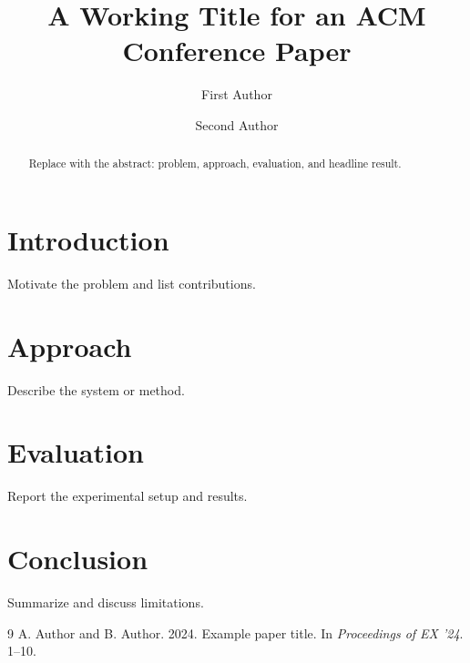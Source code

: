 \documentclass[sigconf,nonacm]{acmart}
\begin{document}
\title{A Working Title for an ACM Conference Paper}

\author{First Author}

\author{Second Author}

\begin{abstract}
Replace with the abstract: problem, approach, evaluation, and headline result.
\end{abstract}

\maketitle

\section{Introduction}
Motivate the problem and list contributions.

\section{Approach}
Describe the system or method.

\section{Evaluation}
Report the experimental setup and results.

\section{Conclusion}
Summarize and discuss limitations.

\begin{thebibliography}{9}
 A. Author and B. Author. 2024. Example paper title. In \textit{Proceedings of EX '24}. 1--10.
\end{thebibliography}
\end{document}
